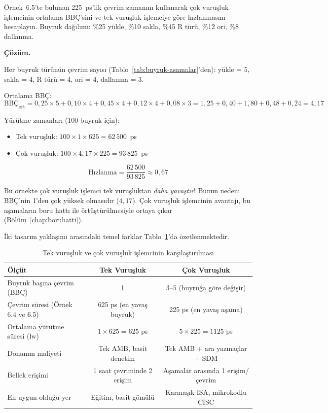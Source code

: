 \begin{ornek}[6.7]
Örnek~6.5'te bulunan 225~ps'lik çevrim zamanını kullanarak çok vuruşluk işlemcinin ortalama BBÇ'sini ve tek vuruşluk işlemciye göre hızlanmasını hesaplayın. Buyruk dağılımı: \%25 yükle, \%10 sakla, \%45 R türü, \%12 ori, \%8 dallanma.

\textbf{Çözüm.}

Her buyruk türünün çevrim sayısı (Tablo~\ref{tab:buyruk-asamalar}'den): yükle = 5, sakla = 4, R türü = 4, ori = 4, dallanma = 3.

Ortalama BBÇ:
\[
\text{BBÇ}_{\text{ort}} = 0{,}25 \times 5 + 0{,}10 \times 4 + 0{,}45 \times 4 + 0{,}12 \times 4 + 0{,}08 \times 3 = 1{,}25 + 0{,}40 + 1{,}80 + 0{,}48 + 0{,}24 = 4{,}17
\]

Yürütme zamanları (100 buyruk için):
\begin{itemize}
    \item Tek vuruşluk: $100 \times 1 \times 625 = 62\,500$~ps
    \item Çok vuruşluk: $100 \times 4{,}17 \times 225 = 93\,825$~ps
\end{itemize}

\[
\text{Hızlanma} = \frac{62\,500}{93\,825} \approx 0{,}67
\]

Bu örnekte çok vuruşluk işlemci tek vuruşluktan \emph{daha yavaştır}! Bunun nedeni BBÇ'nin 1'den çok yüksek olmasıdır ($4{,}17$). Çok vuruşluk işlemcinin avantajı, bu aşamaların boru hattı ile örtüştürülmesiyle ortaya çıkar (Bölüm~\ref{chap:boruhatti}).
\end{ornek}

İki tasarım yaklaşımı arasındaki temel farklar Tablo~\ref{tab:tek-cok-karsilastirma}'da özetlenmektedir.

\begin{table}[htbp]
\centering
\caption{Tek vuruşluk ve çok vuruşluk işlemcinin karşılaştırılması}
\label{tab:tek-cok-karsilastirma}
\small
\setlength{\tabcolsep}{4pt}
\begin{tabular}{lcc}
\toprule
\textbf{Ölçüt} & \textbf{Tek Vuruşluk} & \textbf{Çok Vuruşluk} \\
\midrule
Buyruk başına çevrim (BBÇ) & 1 & 3--5 (buyruğa göre değişir) \\
Çevrim süresi (Örnek 6.4 ve 6.5) & 625 ps (en yavaş buyruk) & 225 ps (en yavaş aşama) \\
Ortalama yürütme süresi (lw) & $1 \times 625 = 625$ ps & $5 \times 225 = 1125$ ps \\
Donanım maliyeti & Tek AMB, basit denetim & Tek AMB + ara yazmaçlar + SDM \\
Bellek erişimi & 1 saat çevriminde 2 erişim & Aşamalar arasında 1 erişim/çevrim \\
En uygun olduğu yer & Eğitim, basit gömülü & Karmaşık ISA, mikrokodlu CISC \\
\bottomrule
\end{tabular}
\end{table}

